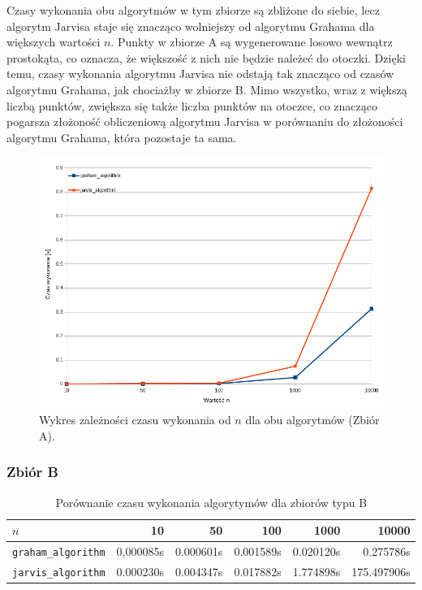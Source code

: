 \documentclass[11pt,a4paper]{article}
\begin{document}
Czasy wykonania obu algorytmów w tym zbiorze są zbliżone do siebie,
lecz algorytm Jarvisa staje się znacząco wolniejszy od algorytmu Grahama
dla większych wartości $n$. Punkty w zbiorze A są wygenerowane losowo
wewnątrz prostokąta, co oznacza, że większość z nich nie będzie należeć do 
otoczki. Dzięki temu, czasy wykonania algorytmu Jarvisa nie odstają tak 
znacząco od czasów algorytmu Grahama, jak chociażby w zbiorze B. 
Mimo wszystko, wraz z większą liczbą punktów, zwiększa się także liczba
punktów na otoczce, co znacząco pogarsza złożoność obliczeniową 
algorytmu Jarvisa w porównaniu do złożoności algorytmu Grahama,
która pozostaje ta sama.

\begin{figure}[H]
    \centering
    \includegraphics[scale=0.6]{res/wykres_a.png}
    \caption{Wykres zależności czasu wykonania 
    od $n$ dla obu algorytmów (Zbiór A).}
\end{figure}

\subsubsection{Zbiór B}
\begin{table}[H]
    \centering
    \begin{tabular}{|l|r|r|r|r|r|}
    \hline
        $n$ & 10 & 50 & 100 & 1000 & 10000 \\ \hline
        \verb|graham_algorithm| & 0,000085s & 0.000601s & 0.001589s & 0.020120s & 0.275786s \\ \hline
        \verb|jarvis_algorithm| & 0.000230s & 0.004347s & 0.017882s & 1.774898s & 175.497906s \\ \hline
    \end{tabular}
    \caption{Porównanie czasu wykonania algorytymów dla zbiorów typu B}
\end{table}
\end{document}

